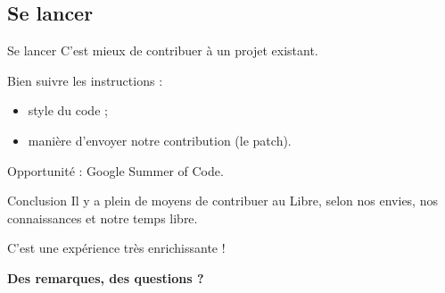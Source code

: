 \documentclass{beamer}
\begin{document}
\subsection{Se lancer}
\begin{frame}{Se lancer}
  C'est mieux de contribuer à un projet existant.

  \bigskip
  Bien suivre les instructions :
  \begin{itemize}
    \item style du code ;
    \item manière d'envoyer notre contribution (le patch).
  \end{itemize}

  \bigskip
  Opportunité : Google Summer of Code.
\end{frame}

\begin{frame}{Conclusion}
  Il y a plein de moyens de contribuer au Libre, selon nos envies, nos connaissances et notre temps libre.

  \bigskip
  C'est une expérience très enrichissante !

  \bigskip
  \begin{center}
    \textbf{{\Large Des remarques, des questions ?}}
  \end{center}
\end{frame}
\end{document}
